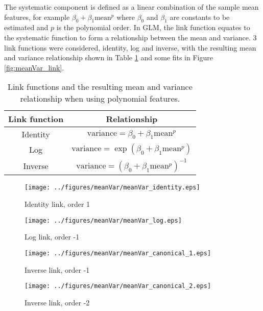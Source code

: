 \documentclass[a4paper]{proc}
\begin{document}
The systematic component is defined as a linear combination of the sample mean features, for example $\beta_0+\beta_1\text{mean}^p$ where $\beta_0$ and $\beta_1$ are constants to be estimated and $p$ is the polynomial order. In GLM, the link function equates to the systematic function to form a relationship between the mean and variance. 3 link functions were considered, identity, log and inverse, with the resulting mean and variance relationship shown in Table \ref{table:link_functions} and some fits in Figure \ref{fig:meanVar_link}.

\begin{table}
	\centering
	\begin{tabular}{c|c}
	Link function & Relationship \\
	\hline
	Identity & $\text{variance} = \beta_0+\beta_1\text{mean}^p$ \\
	Log & $\text{variance} = \exp{\left(\beta_0+\beta_1\text{mean}^p\right)}$ \\
	Inverse & $\text{variance} = \left(\beta_0+\beta_1\text{mean}^p\right)^{-1}$
	\end{tabular}
	\caption{Link functions and the resulting mean and variance relationship when using polynomial features.}
	\label{table:link_functions}
\end{table}

\begin{figure*}
	\centering
	\begin{subfigure}{0.45\textwidth}
		\centering
		\texttt{[image: ../figures/meanVar/meanVar\_identity.eps]}
		\caption{Identity link, order 1}
	\end{subfigure}
	\begin{subfigure}{0.45\textwidth}
		\centering
		\texttt{[image: ../figures/meanVar/meanVar\_log.eps]}
		\caption{Log link, order -1}
	\end{subfigure}
	\begin{subfigure}{0.45\textwidth}
		\centering
		\texttt{[image: ../figures/meanVar/meanVar\_canonical\_1.eps]}
		\caption{Inverse link, order -1}
	\end{subfigure}
	\begin{subfigure}{0.45\textwidth}
		\centering
		\texttt{[image: ../figures/meanVar/meanVar\_canonical\_2.eps]}
		\caption{Inverse link, order -2}
	\end{subfigure}
	\caption{Shading uncorrected mean and variance frequency density plot of each pixel's grey value in the segmented image of the 3D printed sample. A Gamma GLM was fitted with different link functions and polynomial order. The solid and dotted lines are the mean response and the $\Phi(\pm 1)$ quantiles respectively.}
	\label{fig:meanVar_link}
\end{figure*}
\end{document}
